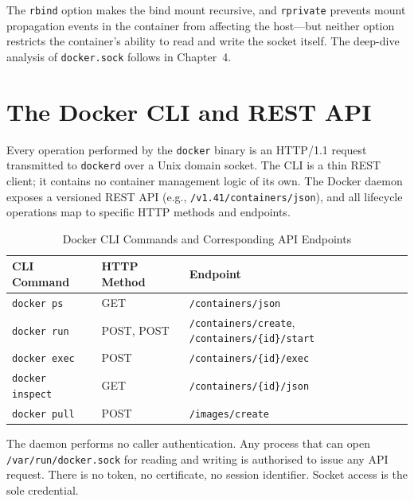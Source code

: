 The \texttt{rbind} option makes the bind mount recursive, and \texttt{rprivate}
prevents mount propagation events in the container from affecting the host---but
neither option restricts the container's ability to read and write the socket itself.
The deep-dive analysis of \texttt{docker.sock} follows in Chapter~4.


\section{The Docker CLI and REST API}
\label{sec:dockersock}

Every operation performed by the \texttt{docker} binary is an HTTP/1.1 request
transmitted to \texttt{dockerd} over a Unix domain socket. The CLI is a thin REST
client; it contains no container management logic of its own. The Docker daemon
exposes a versioned REST API (e.g., \texttt{/v1.41/containers/json}), and all
lifecycle operations map to specific HTTP methods and endpoints.

\begin{table}[h]
\centering
\caption{Docker CLI Commands and Corresponding API Endpoints}
\label{tab:docker-api}
\begin{tabular}{|l|l|l|}
\hline
\textbf{CLI Command}      & \textbf{HTTP Method} & \textbf{Endpoint}                        \\
\hline
\texttt{docker ps}        & GET                  & \texttt{/containers/json}                \\
\texttt{docker run}       & POST, POST           & \texttt{/containers/create},
                                                   \texttt{/containers/\{id\}/start}         \\
\texttt{docker exec}      & POST                 & \texttt{/containers/\{id\}/exec}          \\
\texttt{docker inspect}   & GET                  & \texttt{/containers/\{id\}/json}          \\
\texttt{docker pull}      & POST                 & \texttt{/images/create}                   \\
\hline
\end{tabular}
\end{table}

The daemon performs no caller authentication. Any process that can open
\texttt{/var/run/docker.sock} for reading and writing is authorised to issue any API
request. There is no token, no certificate, no session identifier. Socket access is
the sole credential.

